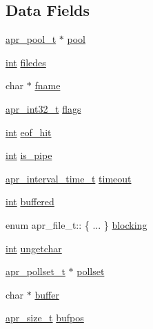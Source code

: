 \subsection*{Data Fields}
\begin{DoxyCompactItemize}
\item 
\hyperlink{structapr__pool__t}{apr\+\_\+pool\+\_\+t} $\ast$ \hyperlink{structapr__file__t_a7945468597b5ce35db7dbffdfff7c861}{pool}
\item 
\hyperlink{pcre_8txt_a42dfa4ff673c82d8efe7144098fbc198}{int} \hyperlink{structapr__file__t_a45e64f29f9c319ecd8e54708de2677b5}{filedes}
\item 
char $\ast$ \hyperlink{structapr__file__t_ab5af46771f16e3b31b4af1824b53cfec}{fname}
\item 
\hyperlink{group__apr__platform_ga21ef1e35fd3ff9be386f3cb20164ff02}{apr\+\_\+int32\+\_\+t} \hyperlink{structapr__file__t_a18dc8a6eb2df404bdb940e66d905e396}{flags}
\item 
\hyperlink{pcre_8txt_a42dfa4ff673c82d8efe7144098fbc198}{int} \hyperlink{structapr__file__t_afbb480effc9c5e5e498da223ca3d01b1}{eof\+\_\+hit}
\item 
\hyperlink{pcre_8txt_a42dfa4ff673c82d8efe7144098fbc198}{int} \hyperlink{structapr__file__t_a1d1e34b978347287b979c8adcdc4e0eb}{is\+\_\+pipe}
\item 
\hyperlink{group__apr__time_gaae2129185a395cc393f76fabf4f43e47}{apr\+\_\+interval\+\_\+time\+\_\+t} \hyperlink{structapr__file__t_a1d5b5bd9d1e3cb6a6937d47e5c51d5b9}{timeout}
\item 
\hyperlink{pcre_8txt_a42dfa4ff673c82d8efe7144098fbc198}{int} \hyperlink{structapr__file__t_ac3ae13f8071d5dd5a6a47c72e1b9dd3c}{buffered}
\item 
enum apr\+\_\+file\+\_\+t\+:: \{ ... \}  \hyperlink{structapr__file__t_a950a17e6fe93c12fdf60c2c7d8023652}{blocking}
\item 
\hyperlink{pcre_8txt_a42dfa4ff673c82d8efe7144098fbc198}{int} \hyperlink{structapr__file__t_a72c2e1a30f41881f7bfacf966f024081}{ungetchar}
\item 
\hyperlink{structapr__pollset__t}{apr\+\_\+pollset\+\_\+t} $\ast$ \hyperlink{structapr__file__t_a069d436cae2a00f76b1dfb56ff48f7e1}{pollset}
\item 
char $\ast$ \hyperlink{structapr__file__t_a7393335589c812059e3c242504598e70}{buffer}
\item 
\hyperlink{group__apr__platform_gaaa72b2253f6f3032cefea5712a27540e}{apr\+\_\+size\+\_\+t} \hyperlink{structapr__file__t_a295cd24d1c06db7dfaed516138ed0518}{bufpos}

\end{DoxyCompactItemize}
